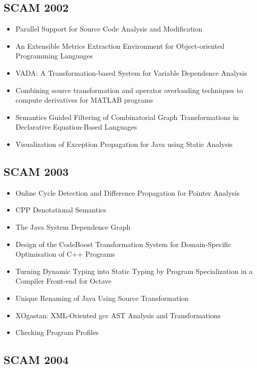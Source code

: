 \subsection{SCAM 2002}

{\small
\begin{itemize}[itemsep=-1ex]
  \item Parallel Support for Source Code Analysis and Modification
  \item An Extensible Metrics Extraction Environment for Object-oriented Programming Languages
  \item VADA: A Transformation-based System for Variable Dependence Analysis
  \item Combining source transformation and operator overloading techniques to compute derivatives for MATLAB programs
  \item Semantics Guided Filtering of Combinatorial Graph Transformations in Declarative Equation-Based Languages
  \item Visualization of Exception Propagation for Java using Static Analysis
\end{itemize}
}

\subsection{SCAM 2003}

{\small
\begin{itemize}[itemsep=-1ex]
  \item Online Cycle Detection and Difference Propagation for Pointer Analysis
  \item CPP Denotational Semantics
  \item The Java System Dependence Graph
  \item Design of the CodeBoost Transformation System for Domain-Specific Optimisation of C++ Programs
  \item Turning Dynamic Typing into Static Typing by Program Specialization in a Compiler Front-end for Octave
  \item Unique Renaming of Java Using Source Transformation
  \item XOgastan: XML-Oriented gcc AST Analysis and Transformations
  \item Checking Program Profiles
\end{itemize}
}

\subsection{SCAM 2004}

